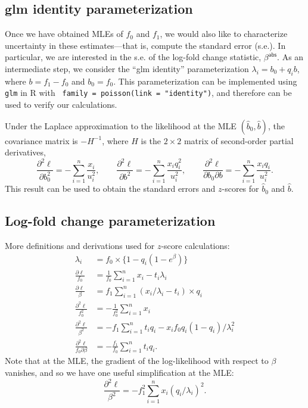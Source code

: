 \documentclass[final]{siamart171218}
\begin{document}
\subsection{glm identity parameterization}

Once we have obtained MLEs of $f_0$ and $f_1$, we would also like to
characterize uncertainty in these estimates---that is, compute the
standard error (s.e.). In particular, we are interested in the s.e. of
the log-fold change statistic, $\beta^{\mathsf{abs}}$. As an
intermediate step, we consider the ``glm identity'' parameterization
$\lambda_i = b_0 + q_i b$, where $b = f_1 - f_0$ and $b_0 = f_0$. This
parameterization can be implemented using {\tt glm} in R with {\tt
  family = poisson(link = "identity")}, and therefore can be used to
verify our calculations.

Under the Laplace approximation to the likelihood at the MLE
$(\hat{b}_0, \hat{b})$, the covariance matrix is $-H^{-1}$, where $H$
is the $2 \times 2$ matrix of second-order partial derivatives,
\begin{equation*}
\frac{\partial^2\ell}{\partial b_0^2} = 
-\sum_{i=1}^n \frac{x_i}{u_i^2}, \qquad
\frac{\partial^2\ell}{\partial b^2} = 
-\sum_{i=1}^n \frac{x_i q_i^2}{u_i^2}, \qquad
\frac{\partial^2\ell}{\partial b_0 \partial b} = 
-\sum_{i=1}^n \frac{x_i q_i}{u_i^2}.
\end{equation*}
This result can be used to obtain the standard errors and $z$-scores
for $\hat{b}_0$ and $\hat{b}$.

\subsection{Log-fold change parameterization}

More definitions and derivations used for $z$-score calculations:
\begin{align}
\lambda_i &= f_0 \times \{1 - q_i(1-e^{\beta})\} \\
\frac{\partial\ell}{f_0} &= \frac{1}{f_0} \sum_{i=1}^n 
x_i - t_i\lambda_i \\
\frac{\partial\ell}{\beta} &= f_1 \sum_{i=1}^n 
(x_i/\lambda_i - t_i) \times q_i \\
\frac{\partial^2\ell}{f_0^2} &=
-\frac{1}{f_0^2} \sum_{i=1}^n x_i \\
\frac{\partial^2\ell}{\beta^2} &= 
-f_1 \sum_{i=1}^n t_i q_i - x_i f_0 q_i (1-q_i)/\lambda_i^2 \\
\frac{\partial^2\ell}{f_0\partial\beta} &= 
-\frac{f_1}{f_0} \sum_{i=1}^n t_i q_i.
\end{align}
Note that at the MLE, the gradient of the log-likelihood with respect
to $\beta$ vanishes, and so we have one useful simplification at the
MLE:
\begin{equation}
\frac{\partial^2\ell}{\beta^2} = -f_1^2 \sum_{i=1}^n x_i (q_i/\lambda_i)^2.
\end{equation}
\end{document}
